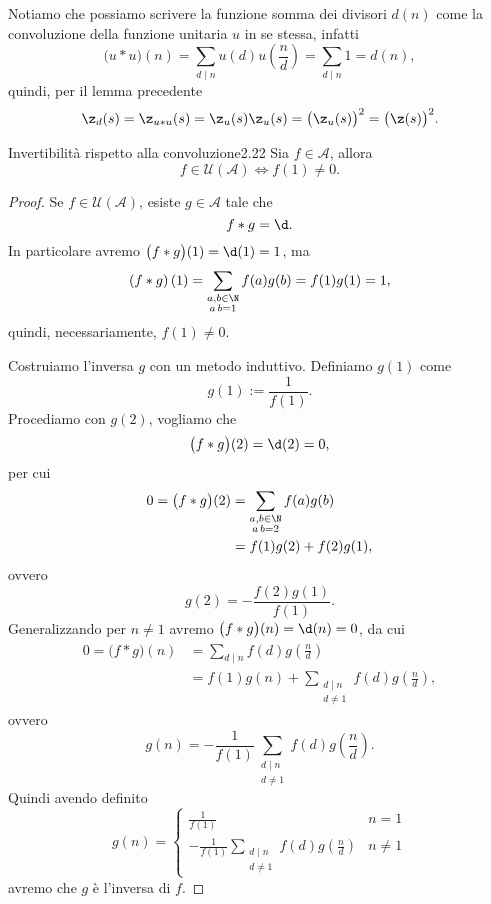 \begin{oss}
	Notiamo che possiamo scrivere la funzione somma dei divisori \(d(n)\) come la convoluzione della funzione unitaria \(u\) in se stessa, infatti
	\[
		\big( u*u \big)(n) = \sum_{d\mid n}u(d) u\!\left( \frac{n}{d} \right)=\sum_{d\mid n} 1 = d(n),
	\]
	quindi, per il lemma precedente
	\[
		\z_d(s)=\z_{u*u}(s)=\z_u(s) \z_u(s)=\big(\z_u(s)\big)^2=\big(\z(s)\big)^2.
	\]
\end{oss}

\begin{teor}{Invertibilità rispetto alla convoluzione}{2.22}
	Sia \(f\in\mathcal{A}\), allora
	\[
		f \in \mathcal{U}(\mathcal{A}) \iff f(1) \neq 0.
	\]
\end{teor}

\begin{proof}
	\graffito{\(\Rightarrow)\)}Se \(f\in\mathcal{U}(\mathcal{A})\), esiste \(g\in\mathcal{A}\) tale che
	\[
		f*g=\d.
	\]
	In particolare avremo \(\big(f*g\big)(1)=\d(1)=1\), ma
	\[
		\left( f*g \right)(1) = \sum_{\substack{a,b\in\N\\a\,b=1}}f(a) g(b)=f(1) g(1) = 1,
	\]
	quindi, necessariamente, \(f(1)\neq 0\).

	\graffito{\(\Leftarrow)\)}Costruiamo l'inversa \(g\) con un metodo induttivo. Definiamo \(g(1)\) come
	\[
		g(1):= \frac{1}{f(1)}.
	\]
	Procediamo con \(g(2)\), vogliamo che
	\[
		\big( f*g \big)(2) = \d(2) = 0,
	\]
	per cui
	\[
		\begin{split}
			0 = \big( f*g \big)(2) & = \sum_{\substack{a,b\in\N\\a\,b=2}}f(a)g(b)\\
			& = f(1)g(2) + f(2)g(1),
		\end{split}
	\]
	ovvero
	\[
		g(2) = -\frac{f(2)g(1)}{f(1)}.
	\]
	Generalizzando per \(n\neq 1\) avremo \(\big( f*g \big)(n)=\d(n)=0\), da cui
	\[
		\begin{split}
			0 = \big( f*g \big)(n) & = \sum_{d\mid n} f(d) g\!\left( \frac{n}{d} \right)\\
			& = f(1)g(n)+\sum_{\substack{d\mid n\\d\neq 1}} f(d) g\!\left( \frac{n}{d} \right),
		\end{split}
	\]
	ovvero
	\[
		g(n) = - \frac{1}{f(1)}\sum_{\substack{d\mid n\\d\neq 1}}f(d) g\!\left( \frac{n}{d} \right).
	\]
	Quindi avendo definito
	\[
		g(n) = 	\begin{cases}
			\displaystyle\frac{1}{f(1)} & n=1                    \\
			\displaystyle- \frac{1}{f(1)}\sum_{\substack{d\mid n \\d\neq 1}}f(d) g\!\left( \frac{n}{d} \right) & n\neq 1
		\end{cases}
	\]
	avremo che \(g\) è l'inversa di \(f\).
\end{proof}


